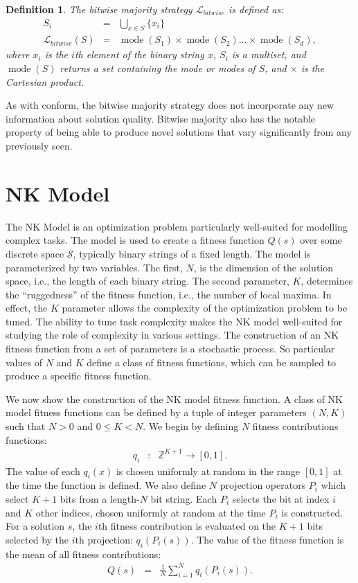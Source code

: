 \documentclass[twocolumn,10pt]{article}
\newtheorem{definition}{Definition}
\DeclareMathOperator{\mode}{mode}
\begin{document}
\begin{definition}
The bitwise majority strategy $\mathcal{L}_{bitwise}$ is defined as:
\begin{eqnarray}
S_i &=& \bigcup_{x \in S} \{x_i\} \\
\mathcal{L}_{bitwise}(S)
&=& \mode(S_1) \times \mode(S_2) \ldots \times \mode(S_d),
\end{eqnarray}
where $x_i$ is the $i$th element of the binary string $x$,
$S_i$ is a multiset, and $\mode(S)$ returns a set containing the mode or modes of $S$, and $\times$ is the Cartesian product.
\end{definition}
As with conform, the bitwise majority strategy does not incorporate any new information about solution quality.
Bitwise majority also has the notable property of being able to produce novel solutions that vary significantly from any previously seen.

\fi

\section{NK Model}
\label{subsec:task}
The NK Model \cite{kauffman_towards_1987} is an optimization problem particularly well-suited for modelling complex tasks. The model is used to create a fitness function $Q(s)$ over some discrete space $\mathcal{S}$, typically binary strings of a fixed length.
The model is parameterized by two variables.
The first, $N$, is the dimension of the solution space, i.e., the length of each binary string.
The second parameter, $K$, determines the ``ruggedness'' of the fitness function, i.e., the number of local maxima.
In effect, the $K$ parameter allows the complexity of the optimization problem to be tuned.
The ability to tune task complexity makes the NK model well-suited for studying the role of complexity in various settings.
The construction of an NK fitness function from a set of parameters is a stochastic process.
So particular values of $N$ and $K$ define a class of fitness functions, which can be sampled to produce a specific fitness function.

We now show the construction of the NK model fitness function.
A class of NK model fitness functions can be defined by a tuple of integer parameters
$(N, K)$ such that $N > 0$ and $0 \leq K < N$.
We begin by defining $N$ fitness contributions functions:
\begin{eqnarray}
q_i &:& \mathbb{Z}^{K+1} \rightarrow [0, 1].
\end{eqnarray}
The value of each $q_i(x)$ is chosen uniformly at random in the range $[0, 1]$ at the time the function is defined.
We also define $N$ projection operators $P_i$ which select $K+1$ bits from a length-$N$ bit string.
Each $P_i$ selects the bit at index $i$ and $K$ other indices, chosen uniformly at random at the time $P_i$ is constructed.
For a solution $s$, the $i$th fitness contribution is evaluated on the $K + 1$ bits selected by the $i$th projection: $q_i(P_i(s))$.
The value of the fitness function is the mean of all fitness contributions:
\begin{eqnarray}
Q(s) &=& \frac{1}{N}\sum_{i=1}^N q_i(P_i(s)).
\end{eqnarray}
\end{document}
